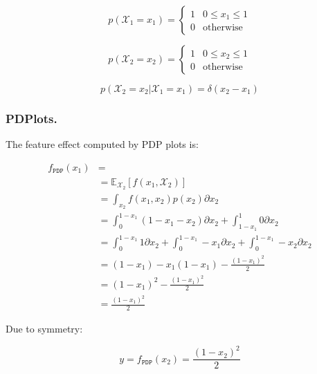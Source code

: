 \documentclass[wcp]{jmlr}
\newcommand{\E}{\mathbb{E}}
\begin{document}
\begin{equation}
  \label{eq:marginal}
  p(\mathcal{X}_1 = x_1) =
  \begin{cases}
    1 & 0 \leq x_1 \leq 1 \\
    0 & \text{otherwise}
  \end{cases}
\end{equation}

\begin{equation}
  \label{eq:marginal}
  p(\mathcal{X}_2 = x_2) =
  \begin{cases}
    1 & 0 \leq x_2 \leq 1 \\
    0 & \text{otherwise}
  \end{cases}
\end{equation}

\begin{equation}
  \label{eq:marginal}
  p(\mathcal{X}_2 = x_2|\mathcal{X}_1 = x_1) = \delta(x_2-x_1)
\end{equation}


\subsubsection*{PDPlots.}

The feature effect computed by PDP plots is:

\begin{equation}
  \label{eq:example-1-pdp}
  \begin{split}
    f_{\mathtt{PDP}}(x_1) &= \\
    & = \mathbb{\E}_{\mathcal{X}_2}[f(x_1,\mathcal{X}_2)] \\
    & = \int_{x_2} f(x_1, x_2) p(x_2) \partial x_2 \\
    & = \int_{0}^{1-x_1} (1 - x_1 - x_2) \partial x_2 + \int_{1-x_1}^1 0 \partial x_2 \\
    & = \int_{0}^{1-x_1} 1 \partial x_2 + \int_{0}^{1-x_1} -x_1 \partial x_2 + \int_{0}^{1-x_1} -x_2 \partial x_2 \\
    & = (1 - x_1) -x_1(1-x_1) - \frac{{(1-x_1)}^2}{2} \\
    & = (1 - x_1)^2 - \frac{{(1-x_1)}^2}{2} \\
    & = \frac{{(1-x_1)}^2}{2}
  \end{split}
\end{equation}

%
Due to symmetry:

\begin{equation}
y = f_{\mathtt{PDP}}(x_2) = \frac{{(1-x_2)}^2}{2}
\end{equation}
\end{document}
